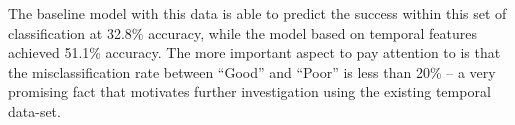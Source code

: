 The baseline model with this data is able to predict the success within this set of classification at 32.8\% accuracy, while the model based on temporal features achieved 51.1\% accuracy. The more important aspect to pay attention to is that the misclassification rate between “Good” and “Poor” is less than 20\% -- a very promising fact that motivates further investigation using the existing temporal data-set.